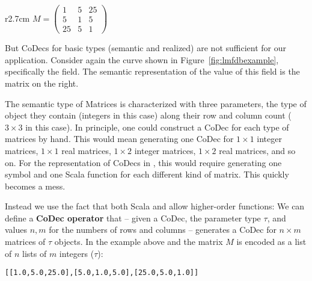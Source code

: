 \begin{wrapfigure}r{2.7cm}\vspace*{-2em}
$M = \left(
    \begin{array}{ccc}
      1 & 5 & 25 \\
      5 & 1 & 5 \\
      25 & 5 & 1 \end{array} 
  \right)$\vspace*{-1em}
\end{wrapfigure}
But CoDecs for basic types (semantic and realized) are not sufficient for our application.
Consider again the  curve shown in Figure~\ref{fig:lmfdbexample}, specifically the  field. 
The semantic representation of the value of this field is the matrix on the right.

The semantic type of Matrices is characterized with three parameters, the type of object they contain (integers in this case) along their row and column count ($3 \times 3$ in this case). 
In principle, one could construct a CoDec for each type of matrices by hand. 
This would mean generating one CoDec for $1 \times 1$ integer matrices, $1 \times 1$ real matrices, $1 \times 2$ integer matrices, $1 \times 2$ real matrices, and so on. 
For the representation of CoDecs in \mmt, this would require generating one symbol and one Scala function for each different kind of matrix. 
This quickly becomes a mess.

Instead we use the fact that both Scala and \ommt allow higher-order functions: 
We can define a \textbf{CoDec operator} that -- given a CoDec, the parameter type $\tau$, and values $n, m$ for the numbers of rows and columns -- generates a CoDec for $n\times m$ matrices of $\tau$ objects. 
In the example above and the matrix $M$ is encoded as a list of $n$ lists of $m$ integers ($\tau$):
\begin{lstlisting}[]
[[1.0,5.0,25.0],[5.0,1.0,5.0],[25.0,5.0,1.0]]
\end{lstlisting}

